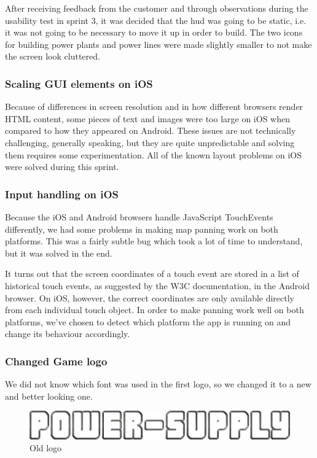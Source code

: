 		After receiving feedback from the customer and through observations during the usability test in sprint 3, it was decided that the hud was going to be static, i.e. it was not going to be necessary to move it up in order to build. The two icons for building power plants and power lines were made slightly smaller to not make the screen look cluttered.

	\subsubsection*{Scaling GUI elements on iOS}
		Because of differences in screen resolution and in how different browsers
		render HTML content, some pieces of text and images were too large on iOS
		when compared to how they appeared on Android. These issues are not
		technically challenging, generally speaking, but they are quite
		unpredictable and solving them requires some experimentation. All of the
		known layout problems on iOS were solved during this sprint.

	\subsubsection*{Input handling on iOS}
		Because the iOS and Android browsers handle JavaScript TouchEvents
		differently, we had some problems in making map panning work on both
		platforms. This was a fairly subtle bug which took a lot of time to
		understand, but it was solved in the end.

		It turns out that the screen coordinates of a touch event are stored in
		a list of historical touch events, as suggested by the W3C
		documentation\cite{touchEventDocumentation}, in the Android browser.
		On iOS, however, the correct coordinates are only available directly from
		each individual touch object. In order to make panning work well on both
		platforms, we've chosen to detect which platform the app is running on
		and change its behaviour accordingly.

	\subsubsection*{Changed Game logo}
		We did not know which font was used in the first logo, so we changed it to a new
		and better looking one. 

		\begin{figure}
			\centering
			\includegraphics[scale=0.4]{pictures/logo2.png}
			\caption{Old logo}
		\end{figure}


